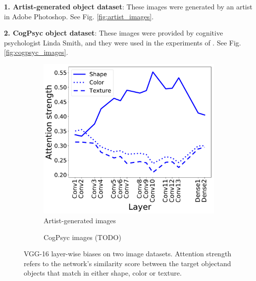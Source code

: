 {\bf1. Artist-generated object dataset}: These images were generated by an artist in Adobe
Photoshop. See Fig. \ref{fig:artist_images}.

{\bf2. CogPsyc object dataset}: These images were provided by cognitive psychologist Linda
Smith, and they were used in the experiments of \cite{Ritter2017}. See Fig.
\ref{fig:cogpsyc_images}.

\begin{figure}[h]
    \begin{center}
        \begin{subfigure}[b]{0.4\textwidth}
            \begin{center}
                \includegraphics[width=\textwidth]{figures/vgg_layer_biases.pdf}
            \end{center}
            \caption{Artist-generated images}
            \label{fig:biases_artist}
        \end{subfigure}
        \begin{subfigure}[b]{0.4\textwidth}
            \caption{CogPsyc images (TODO)}
        \end{subfigure}
        \caption{VGG-16 layer-wise biases on two image datasets. Attention strength refers to
        the network's similarity score between the target objectand objects that match in
        either shape, color or texture.}
    \end{center}
    \label{fig:layerwise_biases}
\end{figure}

